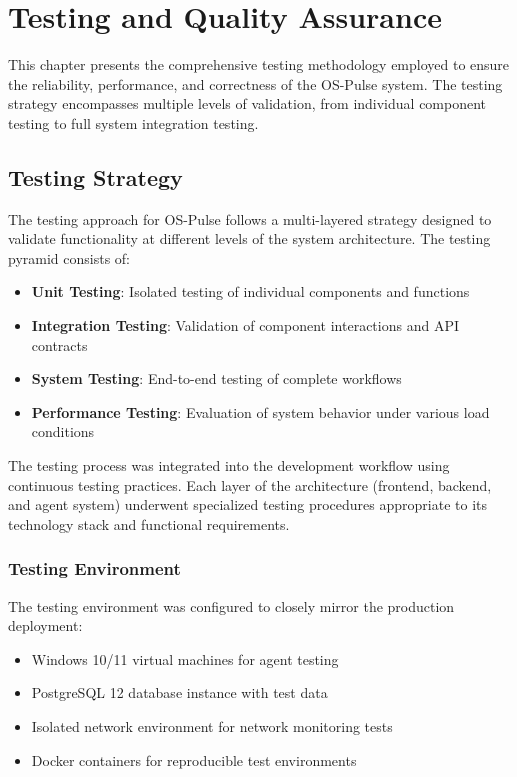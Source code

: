 \chapter{Testing and Quality Assurance}

This chapter presents the comprehensive testing methodology employed to ensure the reliability, performance, and correctness of the OS-Pulse system. The testing strategy encompasses multiple levels of validation, from individual component testing to full system integration testing.

\section{Testing Strategy}

The testing approach for OS-Pulse follows a multi-layered strategy designed to validate functionality at different levels of the system architecture. The testing pyramid consists of:

\begin{itemize}
    \item \textbf{Unit Testing}: Isolated testing of individual components and functions
    \item \textbf{Integration Testing}: Validation of component interactions and API contracts
    \item \textbf{System Testing}: End-to-end testing of complete workflows
    \item \textbf{Performance Testing}: Evaluation of system behavior under various load conditions
\end{itemize}

The testing process was integrated into the development workflow using continuous testing practices. Each layer of the architecture (frontend, backend, and agent system) underwent specialized testing procedures appropriate to its technology stack and functional requirements.

\subsection{Testing Environment}

The testing environment was configured to closely mirror the production deployment:

\begin{itemize}
    \item Windows 10/11 virtual machines for agent testing
    \item PostgreSQL 12 database instance with test data
    \item Isolated network environment for network monitoring tests
    \item Docker containers for reproducible test environments
\end{itemize}

